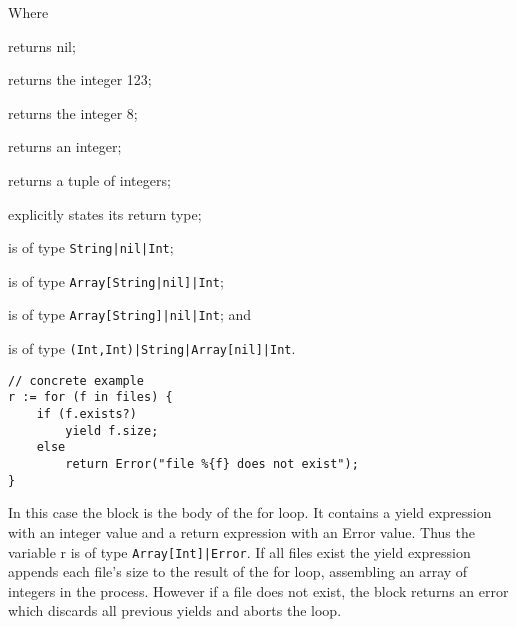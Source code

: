Where \begin{exdesc}
    \item returns nil;
    \item returns the integer 123;
    \item returns the integer 8;
    \item returns an integer;
    \item returns a tuple of integers;
    \item explicitly states its return type;
    \item is of type \lstinline{String|nil|Int};
    \item is of type \lstinline{Array[String|nil]|Int};
    \item is of type \lstinline{Array[String]|nil|Int}; and
    \item is of type \lstinline{(Int,Int)|String|Array[nil]|Int}.
\end{exdesc}

\begin{lstlisting}
// concrete example
r := for (f in files) {
    if (f.exists?)
        yield f.size;
    else
        return Error("file %{f} does not exist");
}
\end{lstlisting}

In this case the block is the body of the for loop. It contains a yield
expression with an integer value and a return expression with an Error value.
Thus the variable r is of type \lstinline{Array[Int]|Error}. If all files exist
the yield expression appends each file's size to the result of the for loop,
assembling an array of integers in the process. However if a file does not
exist, the block returns an error which discards all previous yields and aborts
the loop.
